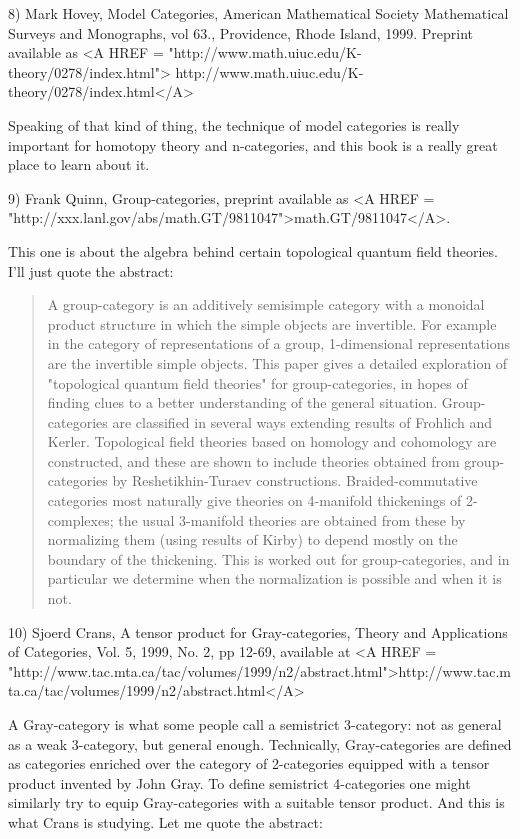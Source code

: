 8) Mark Hovey, Model Categories, American Mathematical Society Mathematical
Surveys and Monographs, vol 63., Providence, Rhode Island, 1999.  Preprint
available as <A HREF = "http://www.math.uiuc.edu/K-theory/0278/index.html">
http://www.math.uiuc.edu/K-theory/0278/index.html</A>

Speaking of that kind of thing, the technique of model categories is 
really important for homotopy theory and n-categories, and this book
is a really great place to learn about it.  

9) Frank Quinn, Group-categories, preprint available as 
<A HREF = "http://xxx.lanl.gov/abs/math.GT/9811047">math.GT/9811047</A>.

This one is about the algebra behind certain topological quantum field 
theories.  I'll just quote the abstract:

\begin{quote}
     A group-category is an additively semisimple category with a
     monoidal product structure in which the simple objects are
     invertible. For example in the category of representations of a
     group, 1-dimensional representations are the invertible simple
     objects. This paper gives a detailed exploration of "topological
     quantum field theories" for group-categories, in hopes of finding
     clues to a better understanding of the general situation.
     Group-categories are classified in several ways extending results
     of Frohlich and Kerler. Topological field theories based on homology
     and cohomology are constructed, and these are shown to include
     theories obtained from group-categories by Reshetikhin-Turaev
     constructions. Braided-commutative categories most naturally give
     theories on 4-manifold thickenings of 2-complexes; the usual
     3-manifold theories are obtained from these by normalizing them
     (using results of Kirby) to depend mostly on the boundary of the
     thickening. This is worked out for group-categories, and in
     particular we determine when the normalization is possible and when
     it is not.
\end{quote}
10) Sjoerd Crans, A tensor product for Gray-categories, 
Theory and Applications of Categories, Vol. 5, 1999, No. 2, pp 12-69, 
available at <A HREF = "http://www.tac.mta.ca/tac/volumes/1999/n2/abstract.html">http://www.tac.mta.ca/tac/volumes/1999/n2/abstract.html</A>
 
A Gray-category is what some people call a semistrict 3-category: not as
general as a weak 3-category, but general enough.  Technically,
Gray-categories are defined as categories enriched over the category of
2-categories equipped with a tensor product invented by John Gray.  To
define semistrict 4-categories one might similarly try to equip
Gray-categories with a suitable tensor product.  And this is what Crans
is studying.  Let me quote the abstract:

